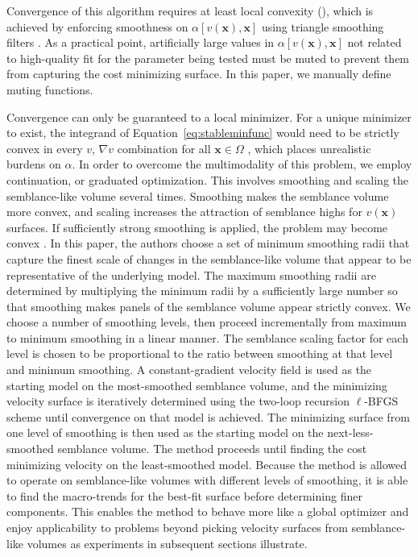 Convergence of this algorithm requires at least local convexity (\citealp{dennis-1977,nocedal-1980,li-2001}), which is achieved by enforcing smoothness on $\alpha[v(\mathbf{x}),\mathbf{x}]$ using triangle smoothing filters \cite[]{claerbout1993earth}.  As a practical point, artificially large values in $\alpha[v(\mathbf{x}),\mathbf{x}]$ not related to high-quality fit for the parameter being tested must be muted to prevent them from capturing the cost minimizing surface.  In this paper, we manually define muting functions.

Convergence can only be guaranteed to a local minimizer.  For a unique minimizer to exist, the integrand of Equation~\ref{eq:stableminfunc} would need to be strictly convex in every $v$, $\nabla v$ combination for all $\mathbf{x} \in \Omega$ \cite[]{dacorogna2004introduction}, which places unrealistic burdens on $\alpha$. In order to overcome the multimodality of this problem, we employ continuation, or graduated optimization.  This involves smoothing and scaling the semblance-like volume several times.  Smoothing makes the semblance volume more convex, and scaling increases the attraction of semblance highs for $v(\mathbf{x})$ surfaces. If sufficiently strong smoothing is applied, the problem may become convex \cite[]{pmlr-v48-hazanb16}.  In this paper, the authors choose a set of minimum smoothing radii that capture the finest scale of changes in the semblance-like volume that appear to be representative of the underlying model.  The maximum smoothing radii are determined by multiplying the minimum radii by a sufficiently large number so that smoothing makes panels of the semblance volume appear strictly convex.  We choose a number of smoothing levels, then proceed incrementally from maximum to minimum smoothing in a linear manner.  The semblance scaling factor for each level is chosen to be proportional to the ratio between smoothing at that level and minimum smoothing. A constant-gradient velocity field is used as the starting model on the most-smoothed semblance volume, and the minimizing velocity surface is iteratively determined using the two-loop recursion $\ell$-BFGS scheme until convergence on that model is achieved.  The minimizing surface from one level of smoothing is then used as the starting model on the next-less-smoothed semblance volume.  The method proceeds until finding the cost minimizing velocity  on the least-smoothed model.  Because the method is allowed to operate on semblance-like volumes with different levels of smoothing, it is able to find the macro-trends for the best-fit surface before determining finer components.  This enables the method to behave more like a global optimizer and enjoy applicability to problems beyond picking velocity surfaces from semblance-like volumes as experiments in subsequent sections illustrate.  


